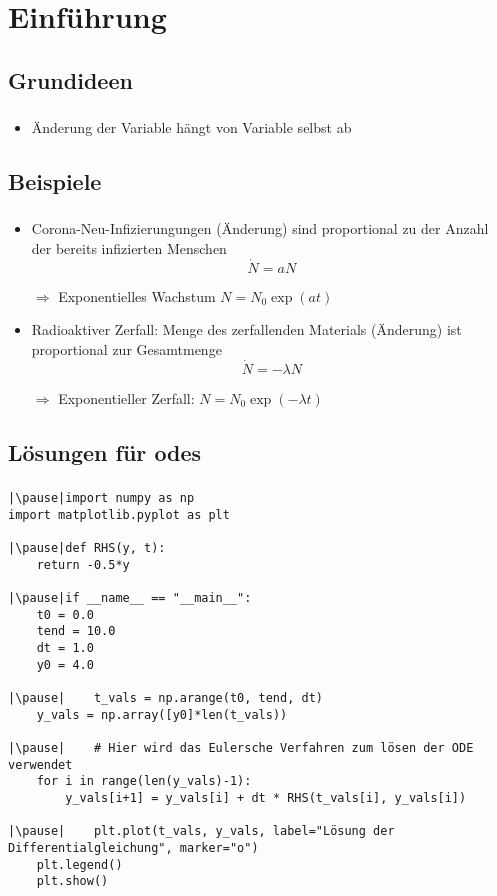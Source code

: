 \section{Einführung}
\label{sec:Introduction}


\subsection{Grundideen}
\label{subsec:basic-concepts}
\begin{frame}
	\frametitle{\insertsubsection}
	\begin{itemize}[<+->]
		\item Änderung der Variable hängt von Variable selbst ab

	\end{itemize}
\end{frame}


\subsection{Beispiele}
\label{subsec:examples}
\begin{frame}
	\frametitle{\insertsubsection}
	\begin{itemize}[<+->]
		\item Corona-Neu-Infizierungungen (Änderung) sind proportional zu der Anzahl der bereits infizierten Menschen
		\[\dot{N} = a N\]
		\item[$\Rightarrow$] Exponentielles Wachstum $N=N_0\exp(at)$
		\item Radioaktiver Zerfall: Menge des zerfallenden Materials (Änderung) ist proportional zur Gesamtmenge
		\[\dot{N} = -\lambda N\]
		\item[$\Rightarrow$] Exponentieller Zerfall: $N=N_0\exp(-\lambda t)$
	\end{itemize}
\end{frame}


\subsection{Lösungen für \acsp{ode}}
\label{subsec:solving}
\begin{frame}[fragile]
    \frametitle{\insertsubsection}
    \begin{verbatim}
|\pause|import numpy as np
import matplotlib.pyplot as plt

|\pause|def RHS(y, t):
    return -0.5*y

|\pause|if __name__ == "__main__":
    t0 = 0.0
    tend = 10.0
    dt = 1.0
    y0 = 4.0

|\pause|    t_vals = np.arange(t0, tend, dt)
    y_vals = np.array([y0]*len(t_vals))

|\pause|    # Hier wird das Eulersche Verfahren zum lösen der ODE verwendet
    for i in range(len(y_vals)-1):
        y_vals[i+1] = y_vals[i] + dt * RHS(t_vals[i], y_vals[i])

|\pause|    plt.plot(t_vals, y_vals, label="Lösung der Differentialgleichung", marker="o")
    plt.legend()
    plt.show()
	\end{verbatim}
\end{frame}


